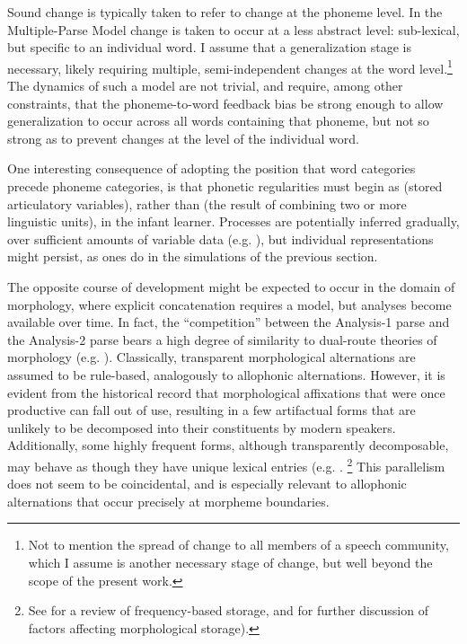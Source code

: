 Sound change is typically taken to refer to change at the phoneme level.
In the Multiple-Parse Model change is taken to occur at a less abstract
level: sub-lexical, but specific to an individual word. I assume that
a generalization stage is necessary, likely requiring multiple, semi-independent
changes at the word level.\footnote{Not to mention the spread of change to all members of a speech community, which I assume is another necessary stage of change, but well beyond the scope of the present work.} The dynamics of such a model are not trivial, and require, among
other constraints, that the phoneme-to-word feedback bias be strong
enough to allow generalization to occur across all words containing
that phoneme, but not so strong as to prevent changes at the level
of the individual word. 

One interesting consequence of adopting the position that word categories
precede phoneme categories, is that phonetic regularities must begin
as  (stored articulatory variables), rather than 
(the result of combining two or more linguistic units), in the infant
learner. Processes are potentially inferred gradually, over sufficient
amounts of variable data (e.g. \citealp{goodman1997inseparability}),
but individual  representations might persist, as 
ones do in the simulations of the previous section. 

The opposite course of development might be expected to occur in the
domain of morphology, where explicit concatenation requires a 
model, but  analyses become available over time. In fact,
the “competition” between the Analysis-1 parse and the Analysis-2 parse bears a high degree of similarity to dual-route theories of
morphology (e.g. \citealt{caramazza1988lexical,frauenfelder1992constraining}).
Classically, transparent morphological alternations are assumed to
be rule-based, analogously to allophonic alternations. However, it
is evident from the historical record that morphological affixations
that were once productive can fall out of use, resulting in a few
artifactual forms that are unlikely to be decomposed into their constituents
by modern speakers. Additionally, some highly frequent forms, although
transparently decomposable, may behave as though they have unique
lexical entries (e.g. \citealt{baayen1997singulars}. \footnote{See \citealt{levelt1999theory}
for a review of frequency-based storage, and \citealt{burani1987representation,baayen1993frequency}
for further discussion of factors affecting morphological storage).}
This parallelism does not seem to be coincidental, and is especially
relevant to allophonic alternations that occur precisely at morpheme
boundaries.

